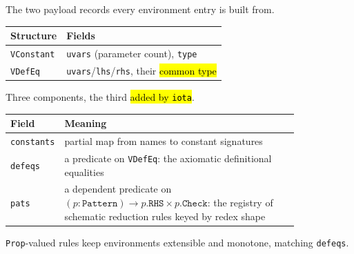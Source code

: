 \begin{definition}
\label{struct:vconstant}
\leanok
{}

 The two payload records every environment entry is built from.
\par\smallskip\noindent
\begin{tabular}{ll}
\toprule
Structure & Fields \\
\midrule
\texttt{VConstant} & \texttt{uvars} (parameter count), \texttt{type} \\
\texttt{VDefEq} & \texttt{uvars}/\texttt{lhs}/\texttt{rhs}, their \hl{common type} \\
\bottomrule
\end{tabular}\par\smallskip
\end{definition}

\begin{definition}
\label{struct:venv}
\leanok
{} 

 Three components, the third \hl{added by \texttt{iota}}.
\par\smallskip\noindent
\begin{tabular}{lp{0.83\linewidth}}
\toprule
Field & Meaning \\
\midrule
\texttt{constants} & partial map from names to constant signatures \\
\texttt{defeqs} & a predicate on \texttt{VDefEq}: the axiomatic definitional equalities \\
\texttt{pats} & a dependent predicate on $(p:\texttt{Pattern}) \to p.\texttt{RHS}\times p.\texttt{Check}$:
the registry of schematic reduction rules keyed by redex shape \\
\bottomrule
\end{tabular}\par\smallskip
\texttt{Prop}-valued rules keep environments extensible and monotone, matching
\texttt{defeqs}.
\end{definition}


